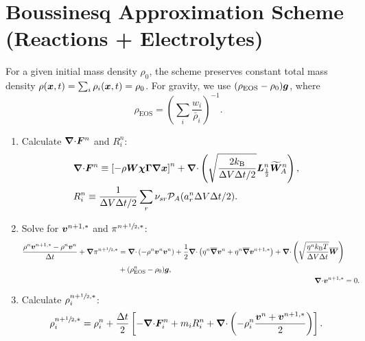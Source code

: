 \documentclass[
10pt
showpacs, showkeys,
amsmath,amssymb,
aps,
pre,
floatfix,
]{revtex4-1}
\newcommand{\divg}{{\V\nabla\cdot}}                       %
\begin{document}
\section*{Boussinesq Approximation Scheme (Reactions + Electrolytes)}

\noindent For a given initial mass density $\rho_0$, the scheme preserves constant total mass density $\rho(\boldsymbol{x},t)=\sum_i \rho_i(\boldsymbol{x},t)=\rho_0$.
For gravity, we use $(\rho_\mathrm{EOS} - \rho_0)\boldsymbol{g}$, where
\begin{equation}
\rho_\mathrm{EOS} = \left(\sum_i \frac{w_i}{\bar{\rho}_i}\right)^{-1}.
\end{equation}

\begin{enumerate}

\item Calculate $\divg\V{F}^n$ and $R^n_i$:
\begin{align}
\label{boussinesq_fluxdiv_2nd}
& \divg\V{F}^n \equiv \left[-\rho\V{W}\V{\chi}\V{\Gamma}\grad\V{x}\right]^n + \divg\left( \sqrt{ \frac{2k_\mathrm{B}}{\D{V}\D{t}/2} } \V{L}^n_{\frac12} \widetilde{\V{W}}^n_A \right), \\
\label{boussinesq_chemrate_2nd}
& R^n_i \equiv \frac{1}{\D{V}\D{t}/2}\sum_r \nu_{sr}\mathcal{P}_A(a^n_r\D{V}\D{t}/2).
\end{align}

\item Solve for $\boldsymbol{v}^{n+1,*}$ and $\pi^{n+\sfrac{1}{2},*}$:
\begin{align}
\label{boussinesq_stokes_v_1st}
\begin{split}
\frac{\rho^n\V{v}^{n+1,*}-\rho^n\V{v}^n}{\D{t}} + \grad\pi^{n+\myhalf,*}
& = \divg\left(-\rho^n\V{v}^n\V{v}^n\right) + 
\frac{1}{2}\divg\left( \eta^n \overline{\grad}\V{v}^n + \eta^n \overline{\grad}\V{v}^{n+1,*} \right)
+ \divg\left( \sqrt{\frac{\eta^n k_\mathrm{B}T}{\D{V}\D{t}} } \overline{\V{W}} \right)
\\
& + (\rho^n_\mathrm{EOS}-\rho_0)\V{g},
\end{split}
\\
\label{boussinesq_stokes_p_1st}
\divg\V{v}^{n+1,*} & = 0.
\end{align}

\item Calculate $\rho^{n+\sfrac{1}{2},*}_i$:
\begin{equation}
\rho^{n+\myhalf,*}_i = \rho^n_i + \frac{\D{t}}{2} \left[ -\divg\V{F}^n_i + m_i R^n_i + \divg\left( -\rho^n_i \frac{\V{v}^n+\V{v}^{n+1,*}}{2} \right) \right].
\end{equation}


\end{enumerate}
\end{document}
